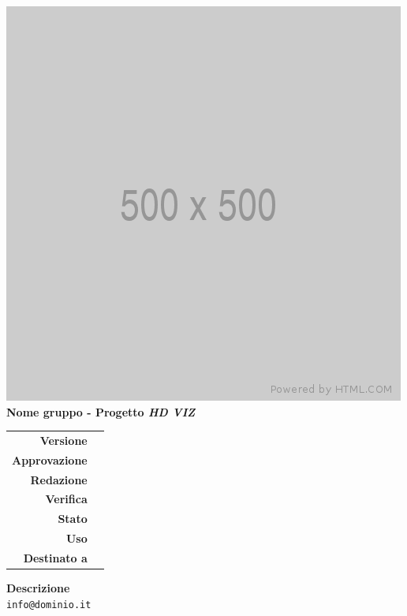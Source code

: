 %
%

\begin{titlepage}

	\begin{center}
		\includegraphics[scale = 0.5]{_template/images/logo.png}\\
		\large \textbf{Nome gruppo - Progetto \emph{HD VIZ}} \\
		\vfill
		\huge \textbf{\titolodocumento}
		\vspace*{\fill}
        
        \vfill
        \large
    \end{center}
    
	\begin{table}[htbp]
        \centering
        \begin{tabular}{r|l}
            \textbf{Versione} & \versione{} \\
            \textbf{Approvazione} & \approvazione{} \\
            \textbf{Redazione} & \redazione{} \\
            \textbf{Verifica} & \verifica{} \\
            \textbf{Stato} & \stato{} \\
            \textbf{Uso} & \uso{} \\
            \textbf{Destinato a} & \destinazione{}
        \end{tabular}
    \end{table}
    
    \begin{center}
        \vfill
        \normalsize
        \textbf{Descrizione}\\
		\descrizionedocumento
        \vfill
        \small
        \texttt{info@dominio.it}
	\end{center}
\end{titlepage}

%
